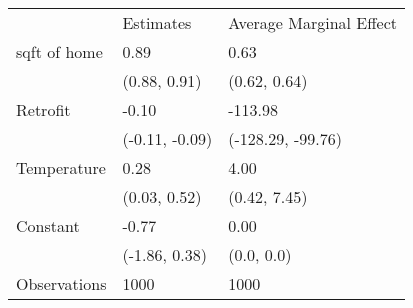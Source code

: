 \begin{tabular}{lll}
 & Estimates & Average Marginal Effect \\
sqft of home & 0.89 & 0.63 \\
  & (0.88, 0.91) & (0.62, 0.64) \\
Retrofit & -0.10 & -113.98 \\
  & (-0.11, -0.09) & (-128.29, -99.76) \\
Temperature & 0.28 & 4.00 \\
  & (0.03, 0.52) & (0.42, 7.45) \\
Constant & -0.77 & 0.00 \\
  & (-1.86, 0.38) & (0.0, 0.0) \\
Observations & 1000 & 1000 \\
\end{tabular}
